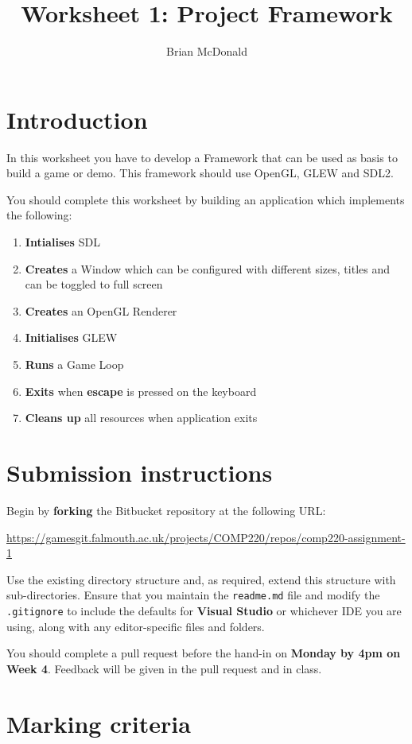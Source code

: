 \documentclass{../../../fal_assignment}
\title{Worksheet 1: Project Framework}
\author{Brian McDonald}
\begin{document}
\maketitle

\section*{Introduction}

In this worksheet you have to develop a Framework that can be used as basis to build a game or demo. This framework should use OpenGL, GLEW and SDL2.

You should complete this worksheet by building an application which implements the following:
\begin{enumerate}[label=(\alph*)]
	\item \textbf{Intialises} SDL
	\item \textbf{Creates} a Window which can be configured with different sizes, titles and can be toggled to full screen
	\item \textbf{Creates} an OpenGL Renderer
	\item \textbf{Initialises} GLEW
	\item \textbf{Runs} a Game Loop
	\item \textbf{Exits} when \textbf{escape} is pressed on the keyboard 
	\item \textbf{Cleans up} all resources when application exits
\end{enumerate}

\section*{Submission instructions}

Begin by \textbf{forking} the Bitbucket repository at the following URL:

\url{https://gamesgit.falmouth.ac.uk/projects/COMP220/repos/comp220-assignment-1}

Use the existing directory structure and, as required, extend this structure with sub-directories.
Ensure that you maintain the \texttt{readme.md} file and modify the \texttt{.gitignore} to include the defaults for \textbf{Visual Studio} or whichever IDE you are using, along with any editor-specific files and folders. 

You should complete a pull request before the hand-in on \textbf{Monday by 4pm on Week 4}. Feedback will be given in the pull request and in class.

\section*{Marking criteria}
\end{document}
